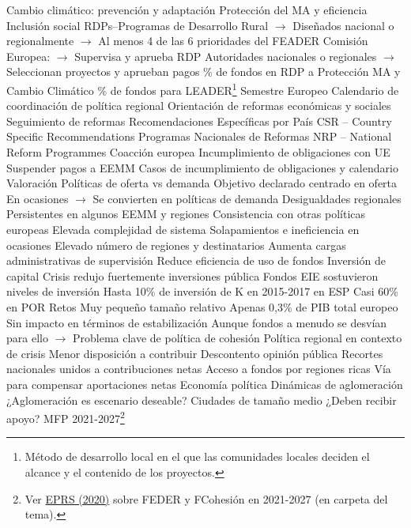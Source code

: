 \documentclass{nuevotema}
\begin{document}
\begin{esquemal}
				\4[5] Cambio climático: prevención y adaptación
				\4[6] Protección del MA y eficiencia
				\4[9] Inclusión social
				\4[] RDPs--Programas de Desarrollo Rural
				\4[] $\to$ Diseñados nacional o regionalmente
				\4[] $\to$ Al menos 4 de las 6 prioridades del FEADER
				\4[] Comisión Europea:
				\4[] $\to$ Supervisa y aprueba RDP
				\4[] Autoridades nacionales o regionales
				\4[] $\to$ Seleccionan proyectos y aprueban pagos
				\% de fondos en RDP a Protección MA y Cambio Climático
				\% de fondos para LEADER\footnote{Método de desarrollo local en el que las comunidades locales deciden el alcance y el contenido de los proyectos. }
			\3 Semestre Europeo
				\4 Calendario de coordinación de política regional
				\4 Orientación de reformas económicas y sociales
				\4 Seguimiento de reformas
				\4[$\then$] Recomendaciones Específicas por País
				\4[] CSR -- Country Specific Recommendations
				\4[$\then$] Programas Nacionales de Reformas
				\4[] NRP -- National Reform Programmes
			\3 Coacción europea
				\4 Incumplimiento de obligaciones con UE
				\4[] Suspender pagos a EEMM
				\4[] Casos de incumplimiento de obligaciones y calendario
		\2 Valoración
			\3 Políticas de oferta vs demanda
				\4 Objetivo declarado centrado en oferta
				\4 En ocasiones
				\4[] $\to$ Se convierten en políticas de demanda
			\3 Desigualdades regionales
				\4 Persistentes en algunos EEMM y regiones
			\3 Consistencia con otras políticas europeas
				\4 Elevada complejidad de sistema
				\4 Solapamientos e ineficiencia en ocasiones
				\4 Elevado número de regiones y destinatarios
				\4[] Aumenta cargas administrativas de supervisión
				\4[] Reduce eficiencia de uso de fondos
			\3 Inversión de capital
				\4 Crisis redujo fuertemente inversiones pública
				\4 Fondos EIE sostuvieron niveles de inversión
				\4[] Hasta 10\% de inversión de K en 2015-2017 en ESP
				\4[] Casi 60\% en POR
		\2 Retos
			\3 Muy pequeño tamaño relativo
				\4 Apenas 0,3\% de PIB total europeo
				\4 Sin impacto en términos de estabilización
				\4[] Aunque fondos a menudo se desvían para ello
				\4[] $\to$ Problema clave de política de cohesión
			\3 Política regional en contexto de crisis
				\4 Menor disposición a contribuir
				\4 Descontento opinión pública
				\4[] Recortes nacionales unidos a contribuciones netas
			\3 Acceso a fondos por regiones ricas
				\4 Vía para compensar aportaciones netas
				\4 Economía política
			\3 Dinámicas de aglomeración
				\4 ¿Aglomeración es escenario deseable?
				\4 Ciudades de tamaño medio
				\4[] ¿Deben recibir apoyo?
			\3 MFP 2021-2027\footnote{Ver \href{https://www.europarl.europa.eu/RegData/etudes/BRIE/2018/625141/EPRS_BRI(2018)625141_EN.pdf}{EPRS (2020)} sobre FEDER y FCohesión en 2021-2027 (en carpeta del tema). }

\end{esquemal}
\end{document}
